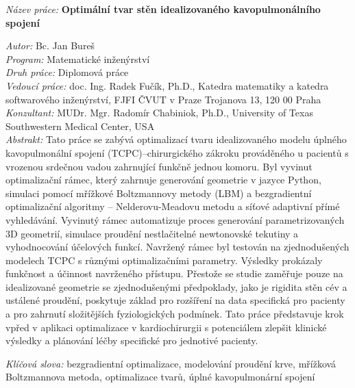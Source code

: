 
%
\begin{onehalfspace}
\noindent \emph{Název práce:}
\noindent \textbf{Optimální tvar stěn idealizovaného kavopulmonálního spojení}
\end{onehalfspace}
\noindent \emph{Autor:} Bc. Jan Bureš\\[2pt]
\noindent \emph{Program:} Matematické inženýrství\\[2pt]
\noindent \emph{Druh práce:} Diplomová práce\\[2pt]
\noindent \emph{Vedoucí práce:} doc. Ing. Radek Fučík, Ph.D.,
Katedra matematiky a katedra softwarového inženýrství, FJFI ČVUT v Praze
Trojanova 13, 120 00 Praha\\[2pt]
\noindent \emph{Konzultant:} MUDr. Mgr. Radomír Chabiniok, Ph.D., University of Texas Southwestern Medical Center, USA\\[2pt]
\noindent \emph{Abstrakt:} Tato práce se zabývá optimalizací tvaru idealizovaného modelu úplného kavopulmonální spojení (TCPC)--chirurgického zákroku prováděného u pacientů s vrozenou srdečnou vadou zahrnující funkčně jednou komoru. Byl vyvinut optimalizační rámec, který zahrnuje generování geometrie v jazyce Python, simulaci pomocí mřížkové Boltzmannovy metody (LBM) a bezgradientní optimalizační algoritmy -- Nelderovu-Meadovu metodu a síťové adaptivní přímé vyhledávání. Vyvinutý rámec automatizuje proces generování parametrizovaných 3D geometrií, simulace proudění nestlačitelné newtonovské tekutiny a vyhodnocování účelových funkcí. Navržený rámec byl testován na zjednodušených modelech TCPC s různými optimalizačními parametry. Výsledky prokázaly funkčnost a účinnost navrženého přístupu. Přestože se studie zaměřuje pouze na idealizované geometrie se zjednodušenými předpoklady, jako je rigidita stěn cév a ustálené proudění, poskytuje základ pro rozšíření na data specifická pro pacienty a pro zahrnutí složitějších fyziologických podmínek. Tato práce představuje krok vpřed v aplikaci optimalizace v kardiochirurgii s potenciálem zlepšit klinické výsledky a plánování léčby specifické pro jednotivé pacienty.

\bigskip{}

\noindent \emph{Klíčová slova:} bezgradientní optimalizace, modelování proudění krve, mřížková Boltzmannova metoda, optimalizace tvarů, úplné kavopulmonární spojení
\vfill{}
~

